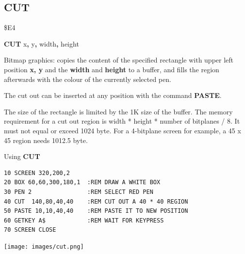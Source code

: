 \subsection{CUT}
\begin{description}[leftmargin=2cm,style=nextline]
\item [Token:] \$E4
\item [Format:] {\bf CUT} x{\bf,} y{\bf,} width{\bf,} height
\item [Usage:] Bitmap graphics: copies the content
               of the specified rectangle
               with upper left position {\bf x, y} and the {\bf width}
               and {\bf height} to a buffer, and fills the region
               afterwards with the colour of the currently selected pen.

               The cut out can be inserted at any position with the
               command {\bf PASTE}.

\item [Remarks:] The size of the rectangle is limited by the 1K size of
                 the buffer. The memory requirement for
                 a cut out region is width * height * number of bitplanes / 8.
                 It must not equal or exceed 1024 byte.
                 For a 4-bitplane screen for example, a 45 x 45 region
                 needs 1012.5 byte.

\item [Example:] Using {\bf CUT}
\begin{tcolorbox}[colback=black,coltext=white]
\verbatimfont{\codefont}
\begin{verbatim}
10 SCREEN 320,200,2
20 BOX 60,60,300,180,1  :REM DRAW A WHITE BOX
30 PEN 2                :REM SELECT RED PEN
40 CUT  140,80,40,40    :REM CUT OUT A 40 * 40 REGION
50 PASTE 10,10,40,40    :REM PASTE IT TO NEW POSITION
60 GETKEY A$            :REM WAIT FOR KEYPRESS
70 SCREEN CLOSE
\end{verbatim}
\end{tcolorbox}
\item \begin{center}\texttt{[image: images/cut.png]}\end{center}
\end{description}


\newpage
